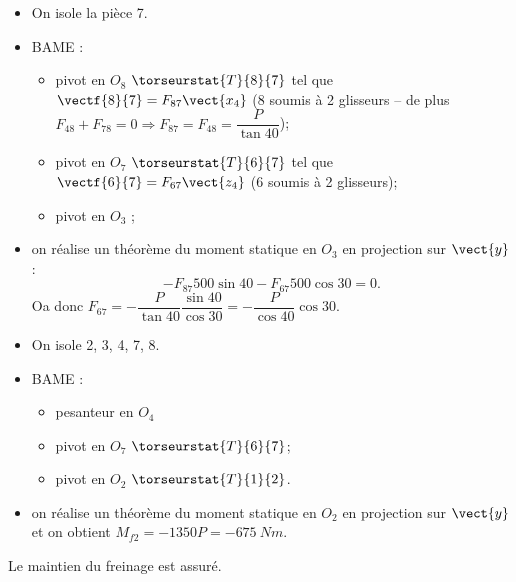 \ifprof
\begin{corrige}
\begin{itemize}
\item On isole la pièce 7.
\item BAME : 
\begin{itemize}
\item pivot en $O_{8}$ $\torseurstat{T}{8}{7}$ tel que $\vectf{8}{7}= F_{87} \vect{x_4}$ (8 soumis à 2 glisseurs -- de plus $F_{48}+F_{78}=0\Rightarrow F_{87}=F_{48}= \dfrac{P}{\tan 40}$);
\item pivot en $O_{7}$ $\torseurstat{T}{6}{7}$ tel que $\vectf{6}{7}= F_{67} \vect{z_4}$ (6 soumis à 2 glisseurs);
\item pivot en $O_{3}$ 	;
\end{itemize}
\item  on réalise un théorème du moment statique en $O_3$ en projection sur $\vect{y}$: 
$$
-F_{87}500\sin 40 -F_{67}500\cos 30  = 0. 
$$
Oa donc 
$F_{67}  = -\dfrac{P}{\tan 40}\dfrac{\sin 40}{\cos 30}  = -\dfrac{P}{\cos 40}{\cos 30} $.

\end{itemize}
\end{corrige}
\else
\fi

\ifprof
\begin{corrige}
\begin{itemize}
\item On isole 2, 3, 4, 7, 8.
\item BAME : 
\begin{itemize}
\item pesanteur en $O_4$
\item pivot en $O_{7}$ $\torseurstat{T}{6}{7}$;
\item pivot en $O_{2}$ $\torseurstat{T}{1}{2}$.
\end{itemize}
\item  on réalise un théorème du moment statique en $O_2$ en projection sur $\vect{y}$ et on obtient 
$M_{f2}=-1350P = -\SI{675}{Nm}$.
\end{itemize}

\end{corrige}
\else
\fi

\ifprof
\begin{corrige}
Le maintien du freinage est assuré.
\end{corrige}
\else
\fi

